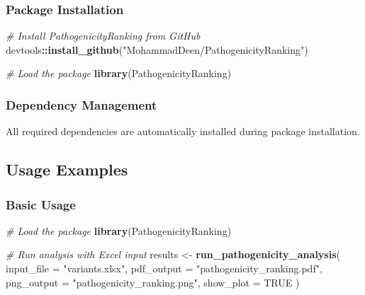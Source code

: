 \documentclass[
  11pt,
]{article}
\newenvironment{Shaded}{\begin{snugshade}}{\end{snugshade}}
\newcommand{\AttributeTok}[1]{\textcolor[rgb]{0.13,0.29,0.53}{#1}}
\newcommand{\CommentTok}[1]{\textcolor[rgb]{0.56,0.35,0.01}{\textit{#1}}}
\newcommand{\ConstantTok}[1]{\textcolor[rgb]{0.56,0.35,0.01}{#1}}
\newcommand{\FunctionTok}[1]{\textcolor[rgb]{0.13,0.29,0.53}{\textbf{#1}}}
\newcommand{\NormalTok}[1]{#1}
\newcommand{\OtherTok}[1]{\textcolor[rgb]{0.56,0.35,0.01}{#1}}
\newcommand{\SpecialCharTok}[1]{\textcolor[rgb]{0.81,0.36,0.00}{\textbf{#1}}}
\newcommand{\StringTok}[1]{\textcolor[rgb]{0.31,0.60,0.02}{#1}}
\begin{document}
\subsubsection{Package Installation}\label{package-installation}

\begin{Shaded}
\begin{Highlighting}[]
\CommentTok{\# Install PathogenicityRanking from GitHub}
\NormalTok{devtools}\SpecialCharTok{::}\FunctionTok{install\_github}\NormalTok{(}\StringTok{"MohammadDeen/PathogenicityRanking"}\NormalTok{)}

\CommentTok{\# Load the package}
\FunctionTok{library}\NormalTok{(PathogenicityRanking)}
\end{Highlighting}
\end{Shaded}

\subsubsection{Dependency Management}\label{dependency-management}

All required dependencies are automatically installed during package
installation.

\subsection{Usage Examples}\label{usage-examples}

\subsubsection{Basic Usage}\label{basic-usage}

\begin{Shaded}
\begin{Highlighting}[]
\CommentTok{\# Load the package}
\FunctionTok{library}\NormalTok{(PathogenicityRanking)}

\CommentTok{\# Run analysis with Excel input}
\NormalTok{results }\OtherTok{\textless{}{-}} \FunctionTok{run\_pathogenicity\_analysis}\NormalTok{(}
  \AttributeTok{input\_file =} \StringTok{"variants.xlsx"}\NormalTok{,}
  \AttributeTok{pdf\_output =} \StringTok{"pathogenicity\_ranking.pdf"}\NormalTok{,}
  \AttributeTok{png\_output =} \StringTok{"pathogenicity\_ranking.png"}\NormalTok{,}
  \AttributeTok{show\_plot =} \ConstantTok{TRUE}
\NormalTok{)}
\end{Highlighting}
\end{Shaded}
\end{document}
